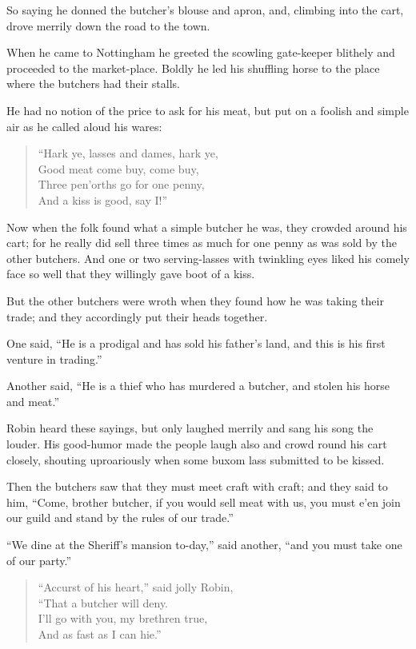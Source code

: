 So saying he donned the butcher's blouse and apron, and, climbing into
the cart, drove merrily down the road to the town.

When he came to Nottingham he greeted the scowling gate-keeper blithely
and proceeded to the market-place. Boldly he led his shuffling horse to
the place where the butchers had their stalls.

He had no notion of the price to ask for his meat, but put on a foolish
and simple air as he called aloud his wares:

\begin{quote}
``Hark ye, lasses and dames, hark ye,\\
Good meat come buy, come buy,\\
Three pen'orths go for one penny,\\
And a kiss is good, say I!''
\end{quote}

Now when the folk found what a simple butcher he was, they crowded
around his cart; for he really did sell three times as much for one
penny as was sold by the other butchers. And one or two serving-lasses
with twinkling eyes liked his comely face so well that they willingly
gave boot of a kiss.

But the other butchers were wroth when they found how he was taking
their trade; and they accordingly put their heads together.

One said, ``He is a prodigal and has sold his father's land, and this is
his first venture in trading.''

Another said, ``He is a thief who has murdered a butcher, and stolen his
horse and meat.''

Robin heard these sayings, but only laughed merrily and sang his song
the louder. His good-humor made the people laugh also and crowd round
his cart closely, shouting uproariously when some buxom lass submitted
to be kissed.

Then the butchers saw that they must meet craft with craft; and they
said to him, ``Come, brother butcher, if you would sell meat with us,
you must e'en join our guild and stand by the rules of our trade.''

``We dine at the Sheriff's mansion to-day,'' said another, ``and you
must take one of our party.''

\begin{quote}
``Accurst of his heart,'' said jolly Robin,\\
``That a butcher will deny.\\
I'll go with you, my brethren true,\\
And as fast as I can hie.''
\end{quote}

